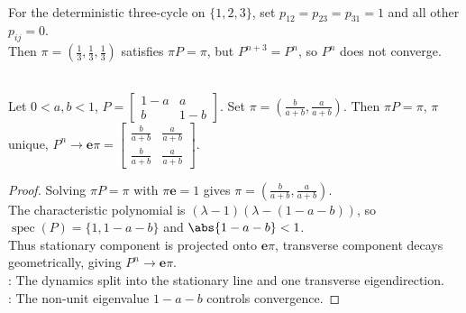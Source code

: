 \begin{remark} \label{rem:stationary-does-not-imply-convergent} \\
For the deterministic three-cycle on $\{1,2,3\}$, set $p_{12}=p_{23}=p_{31}=1$ and all other $p_{ij}=0$.\\
Then $\pi=(\frac{1}{3},\frac{1}{3},\frac{1}{3})$ satisfies $\pi P=\pi$, but $P^{n+3}=P^n$, so $P^n$ does not converge.
\end{remark}

\begin{proposition} \label{prop:two-state-chain-limit} \\
Let $0<a,b<1$, $P=\begin{bmatrix}
1-a&a\\
b&1-b
\end{bmatrix}$. Set $\pi=\left(\frac{b}{a+b},\frac{a}{a+b}\right)$. Then $\pi P=\pi$, $\pi$ unique, $P^n\to\mathbf{e}\pi=
\begin{bmatrix}
\frac{b}{a+b}&\frac{a}{a+b}\\
\frac{b}{a+b}&\frac{a}{a+b}
\end{bmatrix}$.
\begin{proof} Solving $\pi P=\pi$ with $\pi\mathbf{e}=1$ gives $\pi=\left(\frac{b}{a+b},\frac{a}{a+b}\right)$.\\
The characteristic polynomial is $(\lambda-1)(\lambda-(1-a-b))$, so $\operatorname{spec}(P)=\{1,1-a-b\}$ and $\abs{1-a-b}<1$.\\
Thus stationary component is projected onto $\mathbf{e}\pi$, transverse component decays geometrically, giving $P^n\to\mathbf{e}\pi$.\\
: The dynamics split into the stationary line and one transverse eigendirection.\\
: The non-unit eigenvalue $1-a-b$ controls convergence.
\end{proof}
\end{proposition}
